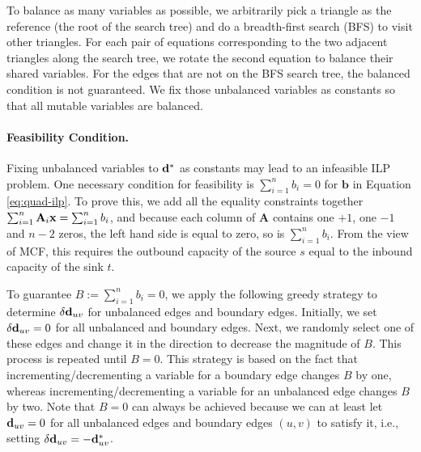 To balance as many variables as possible, we arbitrarily pick a triangle as the reference (the root of the search tree) and do a breadth-first search (BFS) to visit other triangles. For each pair of equations corresponding to the two adjacent triangles along the search tree, we rotate the second equation to balance their shared variables. For the edges that are not on the BFS search tree, the balanced condition is not guaranteed.  We fix those unbalanced variables as constants so that all mutable variables are balanced.


\paragraph*{Feasibility Condition.} Fixing unbalanced variables to ${\mathbf{d}}^*$ as constants may lead to an infeasible ILP problem. One necessary condition for feasibility is $\sum_{i=1}^n b_i=0$ for $\mathbf{b}$ in Equation \eqref{eq:quad-ilp}.  To prove this, we add all the equality constraints together $\sum_{i=1}^n \mathbf{A}_i \mathbf{x} = \sum_{i=1}^n b_i$, and because each column of $\mathbf{A}$ contains one $+1$, one $-1$ and $n-2$ zeros, the left hand side is equal to zero, so is $\sum_{i=1}^n b_i$.  From the view of MCF, this requires the outbound capacity of the source $s$ equal to the inbound capacity of the sink $t$.

To guarantee $B:=\sum_{i=1}^n b_i=0$, we apply the following greedy strategy to determine $\delta \mathbf{d}_{uv}$ for unbalanced edges and boundary edges.  Initially, we set $\delta \mathbf{d}_{uv}=0$ for all unbalanced and boundary edges.  Next, we randomly select one of these edges and change it in the direction to decrease the magnitude of $B$. This process is repeated until $B=0$. This strategy is based on the fact that incrementing/decrementing a variable for a boundary edge changes $B$ by one, whereas incrementing/decrementing a variable for an unbalanced edge changes $B$ by two. Note that $B=0$ can always be achieved because we can at least let ${\mathbf{d}}_{uv}=0$ for all unbalanced edges and boundary edges $(u,v)$ to satisfy it, i.e., setting $\delta \mathbf{d}_{uv} = -{\mathbf{d}}^*_{uv}$.

